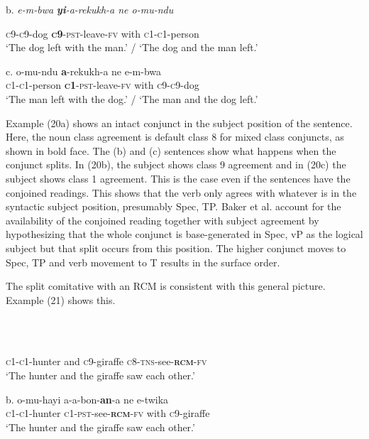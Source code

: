 \documentclass[output=paper]{langsci/langscibook}
\begin{document}
\glt b.\textit{  e-m-bwa  }\textbf{\textit{yi}}\textit{{}-a-rekukh-a     ne   o-mu-ndu}
\z

       \textsc{c9-c9}{}-dog  \textbf{\textsc{c}}\textbf{9}{}-\textsc{pst}{}-leave-\textsc{fv}   with   \textsc{c1-c1}{}-person\\
\glt   ‘The dog left with the man.’ / ‘The dog and the man left.’
\z

\gll \textup{c.}  o-mu-ndu   \textbf{a}{}-rekukh-a     ne   e-m-bwa\\
       \textsc{c1-c1}{}-person   \textbf{\textsc{c}}\textbf{1}{}-\textsc{pst}{}-leave-\textsc{fv}   with   \textsc{c9-c9}{}-dog\\
\glt   ‘The man left with the dog.’ / ‘The man and the dog left.’
\z

Example (20a) shows an intact conjunct in the subject position of the sentence. Here, the noun class agreement is default class 8 for mixed class conjuncts, as shown in bold face. The (b) and (c) sentences show what happens when the conjunct splits. In (20b), the subject shows class 9 agreement and in (20c) the subject shows class 1 agreement. This is the case even if the sentences have the conjoined readings. This shows that the verb only agrees with whatever is in the syntactic subject position, presumably Spec, TP. Baker et al. account for the availability of the conjoined reading together with subject agreement by hypothesizing that the whole conjunct is base-generated in Spec, vP as the logical subject but that split occurs from this position. The higher conjunct moves to Spec, TP and verb movement to T results in the surface order.  

  The split comitative with an RCM is consistent with this general picture. Example (21) shows this.

\begin{listWWviiiNumxlileveli}
\item \ea\label{ex:}
\\
\ea\label{ex:}
\\
\end{listWWviiiNumxlileveli}
       \textsc{c1-c1}{}-hunter   and   \textsc{c}9-giraffe   \textsc{c8-tns}{}-see-\textbf{\textsc{rcm}}\textsc{{}-fv} \\
\glt   ‘The hunter and the giraffe saw each other.’
\z

\gll \textup{b.}  o-mu-hayi     a-a-bon-\textbf{an}{}-a     ne   e-twika\\
       \textsc{c1-c1}{}-hunter    \textsc{c1-pst}{}-see-\textbf{\textsc{rcm}}\textsc{{}-fv}  with  \textsc{c}9-giraffe   \\
\glt   ‘The hunter and the giraffe saw each other.’
\z
\end{document}
